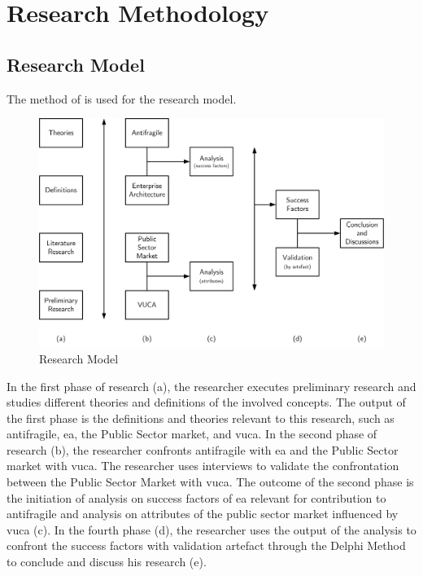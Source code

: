 \chapter{Research Methodology}
\label{ch:research-methodology}

\section{Research Model}
\label{sec:research-model}
The method of \textcite{Verschuren2016} is used for the research model.
	\begin{figure}[h]
		\centering
		\includegraphics[width=12cm]{images/research-model.png}
		\caption[Research Model]{Research Model}
		\label{fig:research-model}
	\end{figure}

In the first phase of research (a), the researcher executes preliminary research and studies different theories and definitions of the involved concepts. The output of the first phase is the definitions and theories relevant to this research, such as \gls{antifragile}, \acrlong{ea}, the Public Sector market, and \acrshort{vuca}. In the second phase of research (b), the researcher confronts \gls{antifragile} with \acrlong{ea} and the Public Sector market with \acrshort{vuca}. The researcher uses interviews to validate the confrontation between the Public Sector Market with \acrshort{vuca}. The outcome of the second phase is the initiation of analysis on success factors of \acrlong{ea} relevant for contribution to \gls{antifragile} and analysis on attributes of the public sector market influenced by \acrshort{vuca} (c). In the fourth phase (d), the researcher uses the output of the analysis to confront the success factors with validation artefact through the Delphi Method to conclude and discuss his research (e).
